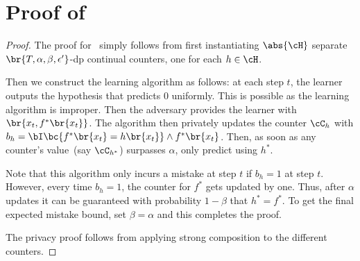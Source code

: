 \section{Proof of~}
\begin{proof} The proof for~ simply follows from first instantiating \(\abs{\cH}\) separate \(\br{T,\alpha,\beta,\epsilon'}\)-\Gls{dp} continual counters, one for each \(h\in\cH\). 

Then we construct the learning algorithm as follows: at each step \(t\), the learner outputs the hypothesis that predicts \(0\) uniformly. This is possible as the learning algorithm is improper. Then the adversary provides the learner with \(\br{x_t, f^*\br{x_t}}\). The algorithm then privately updates the counter \(\cC_{h}\) with \(b_h = \bI\bc{f^*\br{x_t} = h\br{x_t}}\wedge f^*\br{x_t}\). Then, as soon as any counter's value~(say \(\cC_{h^*}\)) surpasses \(\alpha\), only predict using \(h^*\).

Note that this algorithm only incurs a mistake at step \(t\) if \(b_h=1\) at step \(t\). However, every time \(b_h=1\), the counter for \(f^*\) gets updated by one. Thus, after \(\alpha\) updates it can be guaranteed with probability \(1-\beta\) that \(h^* = f^*\). To get the final expected mistake bound, set \(\beta = \alpha\) and this completes the proof.

The privacy proof follows from applying strong composition to the different counters.
\end{proof}